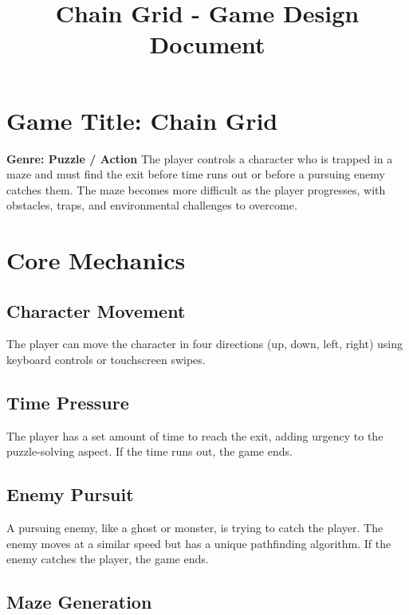 \documentclass{article}
\begin{document}
\title{Chain Grid - Game Design Document}
\author{}
\date{}
\maketitle

\section{Game Title: Chain Grid}
\textbf{Genre: Puzzle / Action}
\noindent
The player controls a character who is trapped in a maze and must find the exit before time runs out or before a pursuing enemy catches them. The maze becomes more difficult as the player progresses, with obstacles, traps, and environmental challenges to overcome.\\

\section{Core Mechanics}

\subsection{Character Movement}
\noindent
The player can move the character in four directions (up, down, left, right) using keyboard controls or touchscreen swipes.\\

\subsection{Time Pressure}
\noindent
The player has a set amount of time to reach the exit, adding urgency to the puzzle-solving aspect. If the time runs out, the game ends.\\

\subsection{Enemy Pursuit}
\noindent
A pursuing enemy, like a ghost or monster, is trying to catch the player. The enemy moves at a similar speed but has a unique pathfinding algorithm. If the enemy catches the player, the game ends.\\

\subsection{Maze Generation}
\noindent
\end{document}
